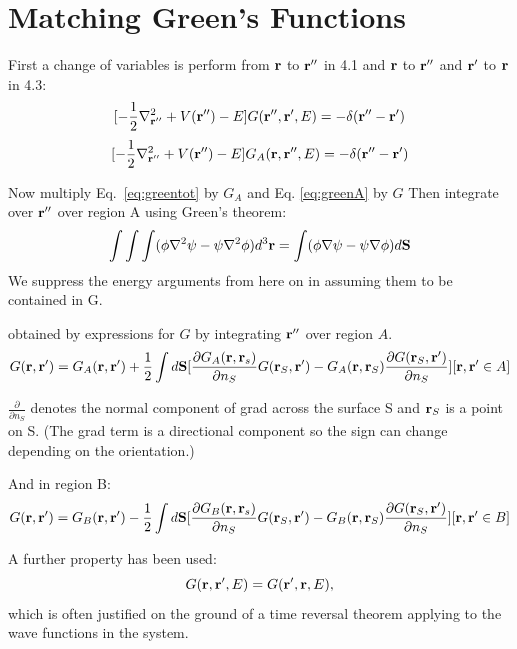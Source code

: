 \section{Matching Green's Functions}
First a change of variables is perform from ${\bf r}$ to ${\bf r}''$ in 4.1 and ${\bf r}$ to ${\bf r}''$ and ${\bf r}'$
to ${\bf r}$ in 4.3:
%
\begin{equation}
\label{eq:greentot}
[-\frac{1}{2}\nabla^{2}_{{\bf r}''} + V({\bf r}'') - E]G({\bf r}'',{\bf r}',E)= -\delta({\bf r}''-{\bf r}')
\end{equation}
%
\begin{equation}
\label{eq:greenA}
[-\frac{1}{2}\nabla^{2}_{{\bf r}''} + V({\bf r}'') - E]G_{A}({\bf r},{\bf r}'',E)= -\delta({\bf r}''-{\bf r}')
\end{equation}

Now multiply Eq.~\ref{eq:greentot} by $G_{A}$ and Eq.
\ref{eq:greenA} by $G$ Then integrate over ${\bf r}''$ over region A using
Green's theorem:
%
\begin{equation}
\label{eq:greenthm}
\int\int\int(\phi\nabla^{2}\psi - \psi\nabla^{2}\phi)d^{3}{\bf r} 
= \int(\phi\nabla\psi-\psi\nabla\phi)d{\mathbf{S}}
\end{equation}
%
We suppress the energy arguments from here on in assuming them to be contained in G. 

obtained by expressions for $G$ by integrating ${\bf r}''$ over region $A$.
%
\begin{equation}
\label{eq:green1a}
G({\bf r},{\bf r}') = G_{A}({\bf r},{\bf r}') + \frac{1}{2} \int d\mathbf{S} 
[\frac{\partial G_{A}({\bf r},{\bf r}_{s})}{\partial n_{S}}G({\bf r}_{S},{\bf r}') - G_{A}({\bf r},{\bf r}_{S})\frac{\partial G({\bf r}_{S},{\bf r}')}{\partial n_{S}}] [{\bf r}, {\bf r}' \in A]
\end{equation}

$\frac{\partial}{\partial n_{S}}$ denotes the normal component of grad across
the surface S and ${\bf r}_{S}$ is a point on S. (The grad term is a directional component
so the sign can change depending on the orientation.)

And in region B:
%
\begin{equation}
\label{eq:green1b}
G({\bf r},{\bf r}') = G_{B}({\bf r},{\bf r}') - \frac{1}{2} \int d\mathbf{S} 
[\frac{\partial G_{B}({\bf r},{\bf r}_{s})}{\partial n_{S}}G({\bf r}_{S},{\bf r}')
- G_{B}({\bf r},{\bf r}_{S})\frac{\partial G({\bf r}_{S},{\bf r}')}{\partial n_{S}}] [{\bf r}, {\bf r}' \in B]
\end{equation}
%

A further property has been used:
%
\begin{equation}
G({\bf r},{\bf r}',E) = G({\bf r}',{\bf r},E),
\end{equation}
%
which is often justified on the ground of a time reversal theorem applying 
to the wave functions in the system.


